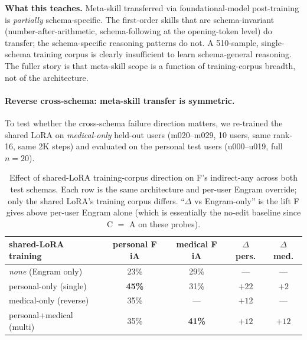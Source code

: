 \documentclass{article}
\begin{document}
\textbf{What this teaches.}
Meta-skill transferred via foundational-model post-training is
\emph{partially} schema-specific. The first-order skills that are
schema-invariant (number-after-arithmetic, schema-following at the
opening-token level) do transfer; the schema-specific reasoning
patterns do not. A 510-sample, single-schema training corpus is
clearly insufficient to learn schema-general reasoning. The fuller
story is that meta-skill scope is a function of training-corpus
breadth, not of the architecture.

\paragraph{Reverse cross-schema: meta-skill transfer is symmetric.}
To test whether the cross-schema failure direction matters, we
re-trained the shared LoRA on \emph{medical-only} held-out users
(m020--m029, 10 users, same rank-16, same 2K steps) and evaluated
on the personal test users (u000--u019, full $n{=}20$).

\begin{table}[t]
  \centering
  \caption{Effect of shared-LoRA training-corpus direction on F's
  indirect-any across both test schemas. Each row is the same
  architecture and per-user Engram override; only the shared LoRA's
  training corpus differs. ``$\Delta$ vs Engram-only'' is the lift
  F gives above per-user Engram alone (which is essentially the
  no-edit baseline since C $=$ A on these probes).}
  \label{tab:meta-direction}
  \begin{tabular}{lcccc}
    \toprule
    shared-LoRA training & personal F iA & medical F iA & $\Delta$ pers. & $\Delta$ med. \\
    \midrule
    \emph{none} (Engram only) & 23\% & 29\% & --- & --- \\
    personal-only (single)   & \textbf{45\%} & 31\% & $+22$ & $+2$ \\
    medical-only (reverse)   & 35\% & --- & $+12$ & --- \\
    personal+medical (multi) & 35\% & \textbf{41\%} & $+12$ & $+12$ \\
    \bottomrule
  \end{tabular}
\end{table}
\end{document}
